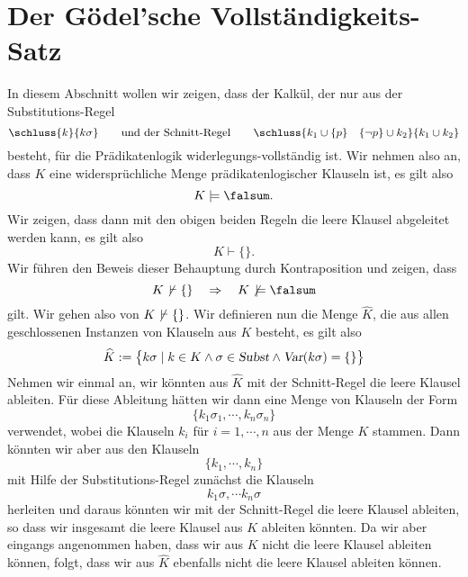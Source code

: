 \section{Der G\"{o}del'sche Vollst\"{a}ndigkeits-Satz}
In diesem Abschnitt wollen wir zeigen, dass der Kalk\"{u}l, der nur aus der Substitutions-Regel
\[ \schluss{k}{k\sigma} \qquad \mbox{und der Schnitt-Regel} \qquad
   \schluss{k_1 \cup \{ p \} \quad \{ \neg p \} \cup k_2}{k_1 \cup k_2} \]
besteht, f\"{u}r die Pr\"{a}dikatenlogik widerlegungs-vollst\"{a}ndig ist.  Wir nehmen also an, dass
$K$ eine widerspr\"{u}chliche Menge pr\"{a}dikatenlogischer Klauseln ist, es gilt also
\[ K \models \falsum. \]
Wir zeigen, dass dann mit den obigen beiden Regeln die leere Klausel abgeleitet werden kann, es gilt
also
\[ K \vdash \{\}. \]
Wir f\"{u}hren den Beweis dieser Behauptung durch Kontraposition und zeigen, dass
\[ K \not\,\vdash \{\} \quad \Rightarrow \quad K \not\,\models \falsum \]
gilt.  Wir gehen also von $K \not\,\vdash \{\}$. 
Wir definieren nun die Menge $\widehat{K}$, die aus allen geschlossenen Instanzen von Klauseln
aus $K$ besteht, es gilt also
\[ \widehat{K} := 
   \bigl\{ k\sigma \mid k \in K \wedge \sigma \in \textsl{Subst} \wedge \textsl{Var}(k\sigma) = \{\} \bigr\} 
\]
Nehmen wir einmal an,  wir k\"{o}nnten aus $\widehat{K}$ mit der Schnitt-Regel die leere Klausel
ableiten.  F\"{u}r diese Ableitung h\"{a}tten wir dann eine Menge von Klauseln der Form
\[ \{ k_1\sigma_1, \cdots, k_n\sigma_n \} \]
verwendet, wobei die Klauseln $k_i$ f\"{u}r $i=1,\cdots,n$ aus der Menge $K$ stammen.
Dann k\"{o}nnten wir aber aus den Klauseln
\[ \{ k_1, \cdots, k_n \} \]
mit Hilfe der Substitutions-Regel zun\"{a}chst die Klauseln 
\[ k_1\sigma, \cdots k_n\sigma  \]
herleiten und daraus k\"{o}nnten wir mit der Schnitt-Regel die leere Klausel ableiten, so dass wir
insgesamt die leere Klausel aus $K$ ableiten k\"{o}nnten.  Da wir aber eingangs angenommen haben, dass
wir aus $K$ nicht die leere Klausel ableiten k\"{o}nnen, folgt, dass wir aus $\widehat{K}$ ebenfalls
nicht die leere Klausel ableiten k\"{o}nnen.  

